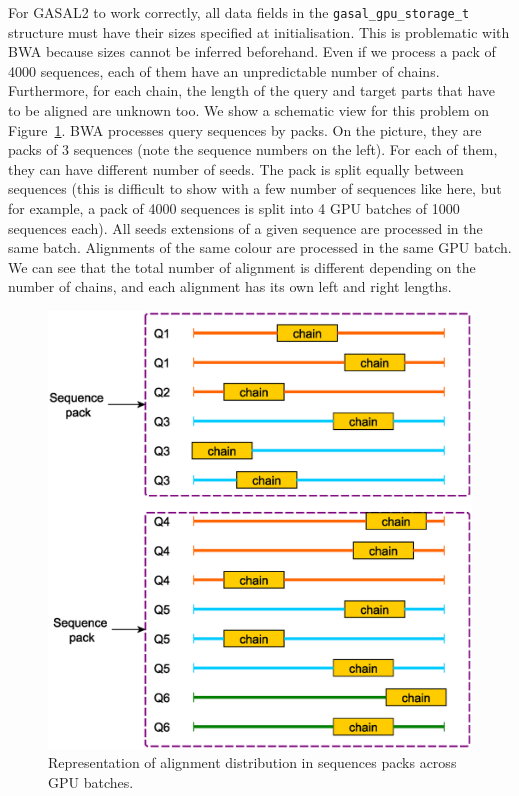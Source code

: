 For GASAL2 to work correctly, all data fields in the \texttt{gasal\_gpu\_storage\_t} structure must have their sizes specified at initialisation. This is problematic with BWA because sizes cannot be inferred beforehand. Even if we process a pack of 4000 sequences, each of them have an unpredictable number of chains. Furthermore, for each chain, the length of the query and target parts that have to be aligned are unknown too. We show a schematic view for this problem on Figure~\ref{fig:cpu-gpu-batches}. BWA processes query sequences by packs. On the picture, they are packs of 3 sequences (note the sequence numbers on the left). For each of them, they can have different number of seeds. The pack is split equally between sequences (this is difficult to show with a few number of sequences like here, but for example, a pack of 4000 sequences is split into 4 GPU batches of 1000 sequences each). All seeds extensions of a given sequence are processed in the same batch. Alignments of the same colour are processed in the same GPU batch. We can see that the total number of alignment is different depending on the number of chains, and each alignment has its own left and right lengths.

\begin{figure}[h!]
	\centering
	\includegraphics[width=1\linewidth]{cpu-gpu-batches}
	\caption{Representation of alignment distribution in sequences packs across GPU batches.}
	\label{fig:cpu-gpu-batches}
\end{figure}


